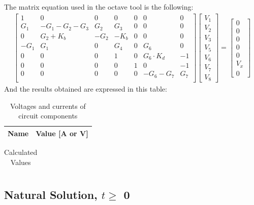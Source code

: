The matrix equation used in the octave tool is the following:
\begin{gather}
	\begin{bmatrix}
		1 & 0 & 0 & 0 & 0 & 0 & 0 \\
		G_1 & -G_1 - G_2 - G_3 & G_2 & G_3 & 0 & 0 & 0 \\
		0 & G_2 + K_b & -G_2 & -K_b & 0 & 0 & 0 \\
		-G_1 & G_1 & 0 & G_4 & 0 & G_6 & 0 \\
		0 & 0 & 0 & 1 & 0 & G_6\cdot K_d & -1 \\
		0 & 0 & 0 & 0 & 1 & 0 & -1 \\
		0 & 0 & 0 & 0 & 0 & -G_6-G_7 & G_7 \\
	\end{bmatrix}
	\begin {bmatrix} V_1 \\ V_2 \\ V_3 \\ V_5  \\ V_6 \\ V_7 \\ V_8 \end{bmatrix}
	=
	\begin {bmatrix} 0  \\ 0  \\ 0  \\ 0 \\ 0  \\ V_x \\ 0 \end{bmatrix}
\end{gather}
And the results obtained are expressed in this table:
\begin{table}[H]
  \centering
  \begin{tabular}{|l|r|}
    \hline    
    {\bf Name} & {\bf Value [A or V]} \\ \hline
    
  \end{tabular}
  \caption{Voltages and currents of circuit components}
  \label{tab:val21}
\end{table}

\begin{table}[H]
  \centering
  \begin{tabular}{|l|r|}
    \hline    
    
  \end{tabular}
  \caption{Calculated Values}
  \label{tab:val22}
\end{table}

\subsection{Natural Solution, $t \geqslant $ 0}

